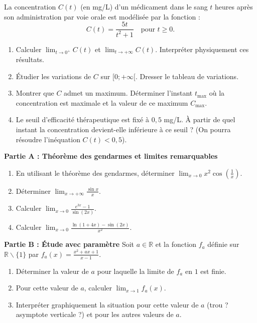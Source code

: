 \documentclass[11pt]{article}
\def\setminus{\mathbin{\backslash}}\let\smallsetminus\setminus
\begin{document}
\begin{exercice}
La concentration $C(t)$ (en mg/L) d'un médicament dans le sang $t$ heures après son administration par voie orale est modélisée par la fonction :
\[ C(t) = \frac{5t}{t^2 + 1} \quad \text{pour } t \ge 0. \]
\begin{enumerate}
    \item Calculer $\lim_{t \to 0^+} C(t)$ et $\lim_{t \to +\infty} C(t)$. Interpréter physiquement ces résultats.
    \item Étudier les variations de $C$ sur $[0 ; +\infty[$. Dresser le tableau de variations.
    \item Montrer que $C$ admet un maximum. Déterminer l'instant $t_{\text{max}}$ où la concentration est maximale et la valeur de ce maximum $C_{\text{max}}$.
    \item Le seuil d'efficacité thérapeutique est fixé à $0,5$ mg/L. À partir de quel instant la concentration devient-elle inférieure à ce seuil ? (On pourra résoudre l'inéquation $C(t) < 0,5$).
\end{enumerate}
\end{exercice}

\begin{exercice}
\textbf{Partie A : Théorème des gendarmes et limites remarquables}
\begin{enumerate}
    \item En utilisant le théorème des gendarmes, déterminer $\lim_{x \to 0} x^2 \cos\left(\frac{1}{x}\right)$.
    \item Déterminer $\lim_{x \to +\infty} \frac{\sin x}{x}$.
    \item Calculer $\lim_{x \to 0} \frac{e^{3x} - 1}{\sin(2x)}$.
    \item Calculer $\lim_{x \to 0} \frac{\ln(1 + 4x) - \sin(2x)}{x^2}$.
\end{enumerate}

\textbf{Partie B : Étude avec paramètre}
Soit $a \in \mathbb{R}$ et la fonction $f_a$ définie sur $\mathbb{R} \setminus \{1\}$ par $f_a(x) = \frac{x^2 + ax + 1}{x - 1}$.
\begin{enumerate}
    \item Déterminer la valeur de $a$ pour laquelle la limite de $f_a$ en $1$ est finie.
    \item Pour cette valeur de $a$, calculer $\lim_{x \to 1} f_a(x)$.
    \item Interpréter graphiquement la situation pour cette valeur de $a$ (trou ? asymptote verticale ?) et pour les autres valeurs de $a$.
\end{enumerate}
\end{exercice}
\end{document}
